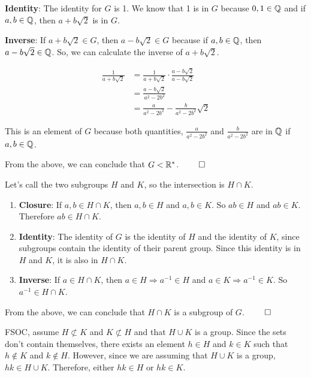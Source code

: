 \documentclass[12pt]{report}
\begin{document}
\textbf{Identity}: The identity for $G$ is 1. We know that 1 is in $G$ because $0,1 \in \QQ$ and if $a,b \in \QQ$, then $a + b\sqrt{2}$ is in $G$.

\textbf{Inverse}: If $a + b\sqrt{2} \in G$, then $a - b\sqrt{2} \in G$ because if $a,b \in \QQ$, then $a - b\sqrt{2} \in \QQ$. So, we can calculate the inverse of $a+b\sqrt{2}$. 

\begin{equation} 
    \begin{split}
        \frac{1}{a+b\sqrt{2}} & = \frac{1}{a+b\sqrt{2}} \cdot \frac{a-b\sqrt{2}}{a-b\sqrt{2}}\\
        & = \frac{a-b\sqrt{2}}{a^2-2b^2}\\
        & =\frac{a}{a^2-2b^2} - \frac{b}{a^2-2b^2}\sqrt{2}
    \end{split}
\end{equation}

This is an element of $G$ because both quantities, $\frac{a}{a^2-2b^2}$ and $\frac{b}{a^2-2b^2}$ are in $\QQ$ if $a,b \in \QQ$. 

From the above, we can conclude that $G < \RR^*$. $\qed$

\sol Let's call the two subgroups $H$ and $K$, so the intersection is $H \cap K$.

\begin{enumerate}
    \item \textbf{Closure}: If $a,b \in H \cap K$, then $a,b \in H$ and $a,b \in K$. So $ab \in H$ and $ab \in K$. Therefore $ab \in H \cap K$.
    \item \textbf{Identity}: The identity of $G$ is the identity of $H$ and the identity of $K$, since subgroups contain the identity of their parent group. Since this identity is in $H$ and $K$, it is also in $H \cap K$.
    \item \textbf{Inverse}: If $a \in H \cap K$, then $a \in H \Rightarrow a^{-1} \in H$ and $a \in K \Rightarrow a^{-1} \in K$. So $a^{-1} \in H \cap K$.
\end{enumerate}

From the above, we can conclude that $H \cap K$ is a subgroup of $G$. $\qed$

\sol FSOC, assume $H \not\subset K$ and $K\not\subset H$ and that $H \cup K$ is a group. Since the sets don't contain themselves, there exists an element $h \in H$ and $k \in K$ such that $h \not\in K$ and $k \not\in H$. However, since we are assuming that $H \cup K$ is a group,  $hk \in H \cup K$. Therefore, either $hk \in H$ or $hk \in K$. 
\end{document}
